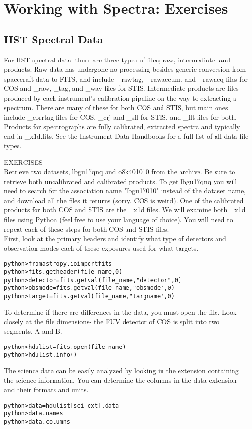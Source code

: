 \chapter{Working with Spectra: Exercises}
\label{ch:using_data}

\section{HST Spectral Data}
For HST spectral data, there are three types of files; raw, intermediate, and products.  Raw data has undergone no processing besides generic conversion from spacecraft data to FITS, and include \_rawtag, \_rawaccum, and \_rawacq files for COS and \_raw, \_tag, and \_wav files for STIS.  Intermediate products are files produced  by each instrument's calibration pipeline on the way to extracting a spectrum. There are many of these for both COS and STIS, but main ones include \_corrtag files for COS, \_crj and \_sfl for STIS, and \_flt files for both. Products for spectrographs are fully calibrated, extracted spectra and typically end in \_x1d.fits. See the Instrument Data Handbooks for a full list of all data file types. 

{\color{blue} {\sf\small EXERCISES}} \\
Retrieve two datasets,  lbgu17qnq and o8k401010 from the archive. Be sure to retrieve both uncalibrated and calibrated products.  To get lbgu17qnq you will need to search for the association name "lbgu17010" instead of the dataset name, and download all the files it returns (sorry, COS is weird).  One of the calibrated products for both COS and STIS are the \_x1d files. We will examine both \_x1d files using Python (feel free to use your language of choice). You will need to repeat each of these steps for both COS and STIS files.\\

First, look at the primary headers and identify what type of detectors and observation modes each of these exposures used for what targets.
\begin{alltt}
python> from astropy.io import fits 
python> fits.getheader(file_name, 0)
python> detector = fits.getval(file_name, "detector", 0)
python> obsmode = fits.getval(file_name, "obsmode", 0)
python> target = fits.getval(file_name, "targname", 0)
\end{alltt}

To determine if there are differences in the data, you must open the file. Look closely at the file dimensions- the FUV detector of COS is split into two segments, A and B.
\begin{alltt}
python> hdulist = fits.open(file_name)
python> hdulist.info()
\end{alltt}
The science data can be easily analyzed by looking in the extension containing the science information. You can determine the columns in the data extension and their formats and units.
\begin{alltt}
python> data = hdulist[sci_ext].data
python> data.names
python> data.columns
\end{alltt}

